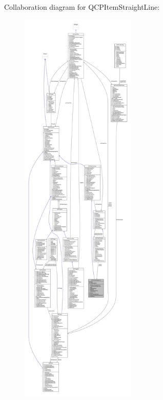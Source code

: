 Collaboration diagram for Q\+C\+P\+Item\+Straight\+Line\+:\nopagebreak
\begin{figure}[H]
\begin{center}
\leavevmode
\includegraphics[height=550pt]{class_q_c_p_item_straight_line__coll__graph}
\end{center}
\end{figure}
